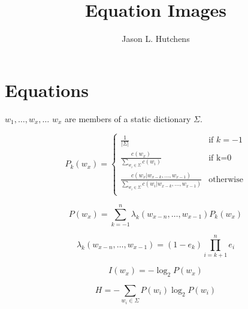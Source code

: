 \documentclass[12pt,a4paper]{article}
\title{Equation Images}
\author{Jason L. Hutchens}
\begin{document}

\maketitle


\begin{abstract}
\end{abstract}


\section{Equations}

$w_{1},\ldots,w_{x},\ldots$
$w_{x}$ are members of a static dictionary $\Sigma$.

\begin{equation}
\label{ppm1}
P_{k}(w_{x}) = \left\{ \begin{array}{ll}
	\frac{1}{|\Sigma|} & \mbox{if $k=-1$} \\
	\frac{c(w_{x})}{\sum_{w_{i} \in \Sigma}c(w_{i})} & \mbox{if k=0} \\
	\frac{c(w_{x}|w_{x-k},\ldots,w_{x-1})}{\sum_{w_{i} \in \Sigma}c(w_{i}|w_{x-k},\ldots,w_{x-1})} & \mbox{otherwise} \\
	\end{array}
	\right.
\end{equation}

\begin{equation}
\label{ppm2}
P(w_{x}) = \sum_{k=-1}^{n} \lambda_{k}(w_{x-n}, \ldots, w_{x-1})P_{k}(w_{x})
\end{equation}

\begin{equation}
\label{ppm3}
\lambda_{k}(w_{x-n}, \ldots, w_{x-1})=(1-e_{k})\prod_{i=k+1}^{n}e_{i}
\end{equation}

\begin{equation}
I(w_{x}) = -\log_{2}P(w_{x})
\label{information}
\end{equation}

\begin{equation}
H = -\sum_{w_{i} \in \Sigma}P(w_{i})\log_{2}P(w_{i})
\label{entropy}
\end{equation}

\end{document}
